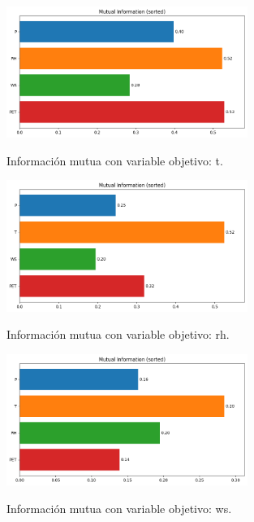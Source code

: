 \begin{figure}[htbp]
    \centering
    \caption{Información mutua con variable objetivo: \gls{t}.}
    \includegraphics[width=0.7\textwidth]{resultados/global/bivariado/mutual_info_T.png}
    \label{fig:mutual_info_T}
\end{figure}

\begin{figure}[htbp]
    \centering
    \caption{Información mutua con variable objetivo: \gls{rh}.}
    \includegraphics[width=0.7\textwidth]{resultados/global/bivariado/mutual_info_RH.png}
    \label{fig:mutual_info_RH}
\end{figure}

\begin{figure}[htbp]
    \centering
    \caption{Información mutua con variable objetivo: \gls{ws}.}
    \includegraphics[width=0.7\textwidth]{resultados/global/bivariado/mutual_info_WS.png}
    \label{fig:mutual_info_WS}
\end{figure}


